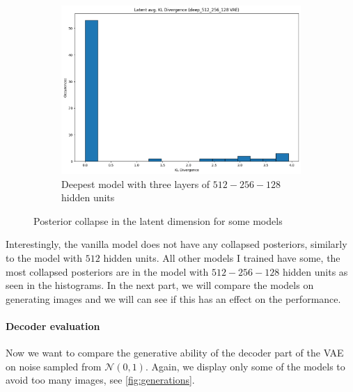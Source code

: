 \documentclass[a4paper,11pt]{article}
\begin{document}
\begin{figure}[ht]
\begin{subfigure}[t]{0.3\textwidth}
        \includegraphics[width=\textwidth]{../images/collapse_512_256_128.png}
        \caption{Deepest model with three layers of $512-256-128$ hidden units}
    \end{subfigure}
    \caption{Posterior collapse in the latent dimension for some models}
    \label{fig:collapse}
\end{figure}

Interestingly, the vanilla model does not have any collapsed posteriors, similarly to the model with $512$ hidden units.
All other models I trained have some, the most collapsed posteriors are in the model with $512-256-128$ hidden units as seen in the histograms.
In the next part, we will compare the models on generating images and we will can see if this has an effect on the performance.

\paragraph{Decoder evaluation} Now we want to compare the generative ability of the decoder part of the VAE on noise sampled from $\mathcal{N}(0, 1)$.
Again, we display only some of the models to avoid too many images, see \ref{fig:generations}.
\end{document}
